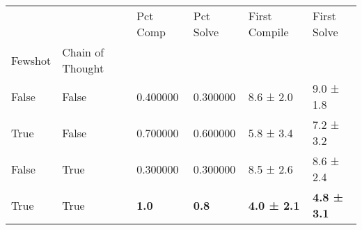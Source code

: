 \begin{tabular}{llllll}
\toprule
 &  & Pct Comp & Pct Solve & First Compile & First Solve \\
Fewshot & Chain of Thought &  &  &  &  \\
\midrule
False & False & 0.400000 & 0.300000 & 8.6 ± 2.0 & 9.0 ± 1.8 \\
\cline{1-6}
True & False & 0.700000 & 0.600000 & 5.8 ± 3.4 & 7.2 ± 3.2 \\
\cline{1-6}
False & True & 0.300000 & 0.300000 & 8.5 ± 2.6 & 8.6 ± 2.4 \\
\cline{1-6}
True & True & \textbf{1.0} & \textbf{0.8} & \textbf{4.0 ± 2.1} & \textbf{4.8 ± 3.1} \\
\cline{1-6}
\bottomrule
\end{tabular}
